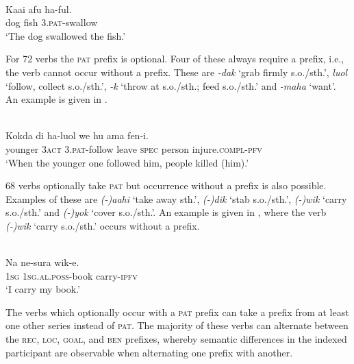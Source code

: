\ea%
\label{bkm:Ref323745334}
 \\ 
\gll     Kaai   afu  ha-ful.\\  
    dog  fish  3.\textsc{pat}{}-swallow  \\
\glt  `The dog swallowed the fish.'
\z







For 72 verbs the \textsc{pat} prefix is optional. Four of these always require a prefix, i.e., the verb cannot occur without a prefix. These are \textit{{}-dak} `grab firmly s.o./sth.', \textit{\discretionary{-}{-}{-}luol} `follow, collect s.o./sth.', \textit{{}-k} `throw at s.o./sth.; feed s.o./sth.' and \textit{{}-maha} `want'. An example is given in .


\ea%
\label{bkm:Ref383697342}
 \\ 
\gll    Kokda   di  ha-luol  we  hu  ama  fen-i. \\  
   younger  3\textsc{act} 3.\textsc{pat}{}-follow  leave  \textsc{spec} person  injure.\textsc{compl}{}-\textsc{pfv}  \\
\glt  `When the younger one followed him, people killed (him).'
\z



 



68 verbs optionally take \textsc{pat} but occurrence without a prefix is also possible. Examples of these are \textit{(-)}\textit{aahi} `take away sth.', \textit{(-)}\textit{dik} `stab s.o./sth.', \textit{(-)}\textit{wik} `carry s.o./sth.' and \textit{(-)}\textit{yok} `cover s.o./sth.'. An example is given in , where the verb \textit{(-)wik} `carry s.o./sth.' occurs without a prefix.


\ea%
\label{bkm:Ref383697351}
 \\ 
\gll     Na   ne-sura  wik-e.\\  
     1\textsc{sg} \textsc{1sg.al.poss}{}-book  carry-\textsc{ipfv} \\
\glt  `I carry my book.'
\z







The verbs which optionally occur with a \textsc{pat} prefix can take a prefix from at least one other series instead of \textsc{pat}. The majority of these verbs can alternate between the \textsc{rec}, \textsc{loc}, \textsc{goal}, and \textsc{ben} prefixes, whereby semantic differences in the indexed participant are observable when alternating one prefix with another.

